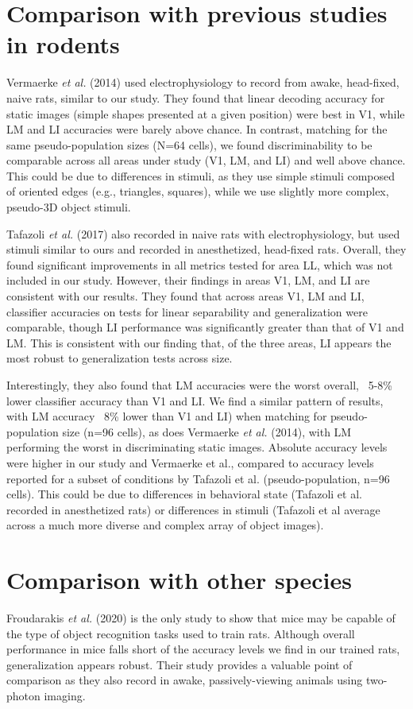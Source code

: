 \section{Comparison with previous studies in rodents}
Vermaerke \textit{et al.} (2014) used electrophysiology to record from awake, head-fixed, naive rats, similar to our study. They found that linear decoding accuracy for static images (simple shapes presented at a given position) were best in V1, while LM and LI accuracies were barely above chance. In contrast, matching for the same pseudo-population sizes (N=64 cells), we found discriminability to be comparable across all areas under study (V1, LM, and LI) and well above chance. This could be due to differences in stimuli, as they use simple stimuli composed of oriented edges (e.g., triangles, squares), while we use slightly more complex, pseudo-3D object stimuli.

Tafazoli \textit{et al.} (2017) also recorded in naive rats with electrophysiology, but used stimuli similar to ours and recorded in anesthetized, head-fixed rats. Overall, they found significant improvements in all metrics tested for area LL, which was not included in our study. However, their findings in areas V1, LM, and LI are consistent with our results. They found that across areas V1, LM and LI, classifier accuracies on tests for linear separability and generalization were comparable, though LI performance was significantly greater than that of V1 and LM. This is consistent with our finding that, of the three areas, LI appears the most robust to generalization tests across size.

Interestingly, they also found that LM accuracies were the worst overall, ~5-8\% lower classifier accuracy than V1 and LI. We find a similar pattern of results, with LM accuracy ~8\% lower than V1 and LI) when matching for pseudo-population size (n=96 cells), as does Vermaerke \textit{et al.} (2014), with LM performing the worst in discriminating static images. Absolute accuracy levels were higher in our study and Vermaerke et al., compared to accuracy levels reported for a subset of conditions by Tafazoli et al. (pseudo-population, n=96 cells). This could be due to differences in behavioral state (Tafazoli et al. recorded in anesthetized rats) or differences in stimuli (Tafazoli et al average across a much more diverse and complex array of object images). 

\section{Comparison with other species}
Froudarakis \textit{et al.} (2020) is the only study to show that mice may be capable of the type of object recognition tasks used to train rats. Although overall performance in mice falls short of the accuracy levels we find in our trained rats, generalization appears robust. Their study provides a valuable point of comparison as they also record in awake, passively-viewing animals using two-photon imaging.

